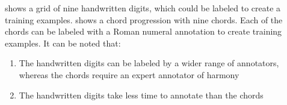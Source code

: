 

 shows a grid of nine handwritten digits,
which could be labeled to create a training examples.
 shows a chord progression with nine chords.
Each of the chords can be labeled with a Roman numeral
annotation to create training examples. It can be noted
that:

\begin{enumerate}
    \item The handwritten digits can be labeled by a wider range of annotators, whereas the chords require an expert annotator of harmony
    \item The handwritten digits take less time to annotate than the chords
\end{enumerate}


